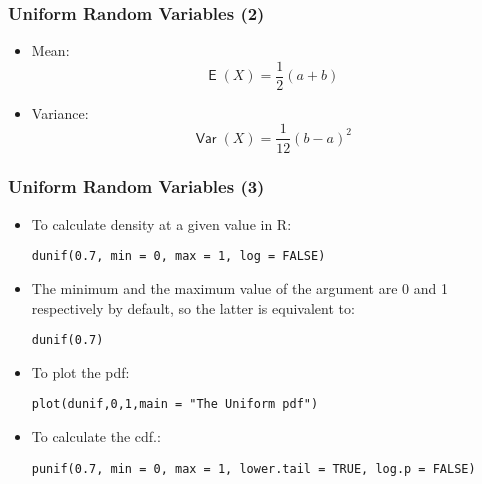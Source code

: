 \documentclass[10pt]{beamer}
\DeclareMathOperator{\E}{\mathsf{E}}
\DeclareMathOperator{\var}{\mathsf{Var}}
\theoremstyle{definition}
\begin{document}
\begin{frame}[fragile]
\frametitle{Uniform Random Variables (2)}
\begin{itemize}
	\item Mean:
	\[
		\E(X) = \dfrac{1}{2}(a + b)
	\]
	
	\item Variance:
	\[
		\var(X) = \dfrac{1}{12}(b - a)^{2}
	\]
\end{itemize}
\end{frame}

\begin{frame}[fragile]
\frametitle{Uniform Random Variables (3)}
\begin{itemize}
	\item To calculate density at a given value in R:
	\begin{lstlisting}[style = rstyle, breaklines]
	dunif(0.7, min = 0, max = 1, log = FALSE)
	\end{lstlisting}

	\item The minimum and the maximum value of the argument are 0 and 1 respectively by default, so the latter is equivalent to:
	\begin{lstlisting}[style = rstyle, breaklines]
	dunif(0.7)
	\end{lstlisting}

	\item To plot the pdf:
	\begin{lstlisting}[style = rstyle, breaklines]
	plot(dunif,0,1,main = "The Uniform pdf")
	\end{lstlisting}

	\item To calculate the cdf.:
	\begin{lstlisting}[style = rstyle, breaklines]
	punif(0.7, min = 0, max = 1, lower.tail = TRUE, log.p = FALSE)
	\end{lstlisting}
	\end{itemize}
\end{frame}
\end{document}
